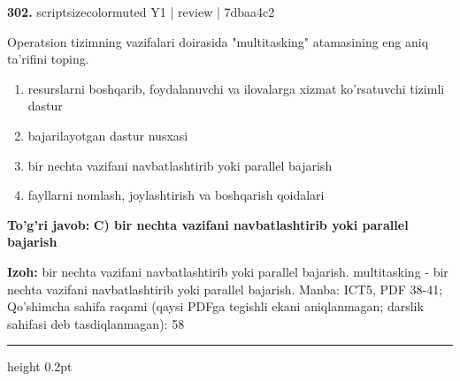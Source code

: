 \documentclass[10pt,a4paper]{article}
\begin{document}
{\bfseries\sffamily\color{ink} 302.} {scriptsizecolor{muted} Y1 | review | 7dbaa4c2}
\par
Operatsion tizimning vazifalari doirasida "multitasking" atamasining eng aniq ta'rifini toping.
\begin{enumerate}[label=\Alph*),leftmargin=9mm]
\item resurslarni boshqarib, foydalanuvchi va ilovalarga xizmat ko'rsatuvchi tizimli dastur
\item bajarilayotgan dastur nusxasi
\item bir nechta vazifani navbatlashtirib yoki parallel bajarish
\item fayllarni nomlash, joylashtirish va boshqarish qoidalari
\end{enumerate}
\begin{tcolorbox}[enhanced,breakable,colback=teal!4,colframe=teal!60!black,boxrule=0.45pt,arc=1.2mm,left=2.7mm,right=2.7mm,top=1.8mm,bottom=1.8mm,before skip=2mm,after skip=2mm]
{\bfseries\sffamily\color{teal}To'g'ri javob:} \textbf{C) bir nechta vazifani navbatlashtirib yoki parallel bajarish}
\par\smallskip
{\bfseries Izoh:} bir nechta vazifani navbatlashtirib yoki parallel bajarish. multitasking - bir nechta vazifani navbatlashtirib yoki parallel bajarish. Manba: ICT5, PDF 38-41; Qo'shimcha sahifa raqami (qaysi PDFga tegishli ekani aniqlanmagan; darslik sahifasi deb tasdiqlanmagan): 58
\end{tcolorbox}
\vspace{2mm}\hrule height 0.2pt\vspace{3mm}
\end{document}
